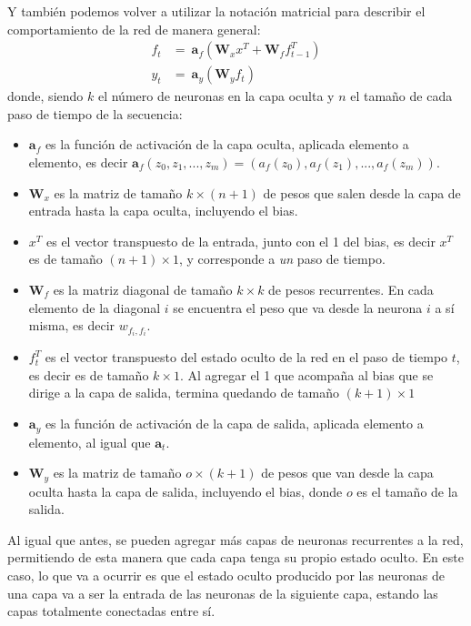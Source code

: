 \documentclass[../../main.tex]{subfiles}
\begin{document}
Y también podemos volver a utilizar la notación matricial para describir el comportamiento
de la red de manera general:
\begin{align*}
    f_t &=\ \bm{a}_f \left( \mathbf{W}_x x^T + \mathbf{W}_f f_{t-1}^T \right) \\
    y_t &=\ \bm{a}_y \left( \mathbf{W}_y f_t \right)
\end{align*}
donde, siendo \(k\) el número de neuronas en la capa oculta y \(n\) el tamaño de cada
paso de tiempo de la secuencia:
\begin{itemize}[itemsep=0.05cm]
    \item \(\bm{a}_f\) es la función de activación de la capa oculta, aplicada elemento a
    elemento, es decir \(\bm{a}_f(z_0, z_1, ..., z_m) = (a_f(z_0), a_f(z_1), ...,
    a_f(z_m))\).
    \item \(\mathbf{W}_x\) es la matriz de tamaño \(k \times (n+1)\) de pesos que salen
    desde la capa de entrada hasta la capa oculta, incluyendo el bias.
    \item \(x^T\) es el vector transpuesto de la entrada, junto con el 1 del bias,
    es decir \(x^T\) es de tamaño \((n+1) \times 1\), y corresponde a \textit{un}
    paso de tiempo.
    \item \(\mathbf{W}_f\) es la matriz diagonal de tamaño \(k \times k\) de pesos
    recurrentes. En cada elemento de la diagonal \(i\) se encuentra el peso que va desde
    la neurona \(i\) a sí misma, es decir \(w_{f_i, f_i}\).
    \item \(f_{t}^T\) es el vector transpuesto del estado oculto de la red en el paso de
    tiempo \(t\), es decir es de tamaño \(k \times 1\). Al agregar el 1 que acompaña al
    bias que se dirige a la capa de salida, termina quedando de tamaño \((k+1) \times 1\)
    \item \(\bm{a}_y\) es la función de activación de la capa de salida, aplicada elemento a
    elemento, al igual que \(\bm{a}_t\).
    \item \(\mathbf{W}_y\) es la matriz de tamaño \(o \times (k+1)\) de pesos que van
    desde la capa oculta hasta la capa de salida, incluyendo el bias, donde \(o\) es el
    tamaño de la salida.
\end{itemize}

Al igual que antes, se pueden agregar más capas de neuronas recurrentes a la red,
permitiendo de esta manera que cada capa tenga su propio estado oculto. En este caso, lo
que va a ocurrir es que el estado oculto producido por las neuronas de una capa va a ser
la entrada de las neuronas de la siguiente capa, estando las capas totalmente conectadas
entre sí.
\end{document}
